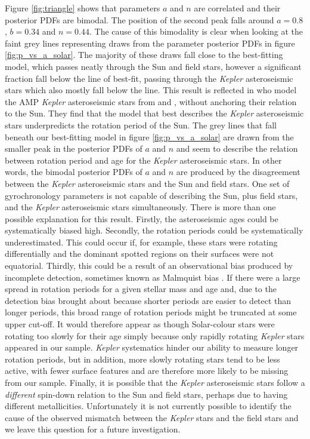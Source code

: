 \documentclass[useAMS, usenatbib]{mn2e}
\begin{document}
Figure \ref{fig:triangle} shows that parameters $a$ and $n$ are
correlated and their posterior PDFs are bimodal.
The position of the second peak falls around $a = 0.8$, $b = 0.34$ and
$n = 0.44$.
The cause of this bimodality is clear when looking at the faint grey lines
representing draws from the parameter posterior PDFs in
figure \ref{fig:p_vs_a_solar}.
The majority of these draws fall close to the best-fitting model, which passes
neatly through the Sun and field stars, however a significant fraction fall
below the line of best-fit, passing through the {\it Kepler} asteroseismic
stars which also mostly fall below the line.
This result is reflected in \citet{Garcia2014} who model the AMP {\it Kepler}
asteroseismic stars from \citet{Mathur2012} and \citet{Metcalfe2014}, without
anchoring their relation to the Sun.
They find that the model that best describes the {\it Kepler} asteroseismic
stars underpredicts the rotation period of the Sun.
The grey lines that fall beneath our best-fitting model in figure
\ref{fig:p_vs_a_solar} are drawn from the smaller peak in the posterior PDFs
of $a$ and $n$ and seem to describe the relation between rotation period and
age for the {\it Kepler} asteroseismic stars.
In other words, the bimodal posterior PDFs of $a$ and $n$ are produced by the
disagreement between the {\it Kepler} asteroseismic stars and the Sun and field
stars.
One set of gyrochronology parameters is not
capable of describing the Sun, plus field stars, and the {\it Kepler}
asteroseismic stars simultaneously.
There is more than one possible explanation for this result.
Firstly, the asteroseismic ages could be systematically biased high.
Secondly, the rotation periods could be systematically underestimated.
This could occur if, for example, these stars were rotating differentially
and the dominant spotted regions on their surfaces were not equatorial.
Thirdly, this could be a result of an observational bias produced by incomplete
detection, sometimes known as Malmquist bias \citep{Malmquist1920}.
If there were a large spread in rotation periods for a given stellar mass and
age and, due to the detection bias brought about because shorter periods are
easier to detect than longer periods, this broad range of rotation periods
might be truncated at some upper cut-off.
It would therefore appear as though Solar-colour stars were rotating too
slowly for their age simply because only rapidly rotating {\it Kepler} stars
appeared in our sample.
{\it Kepler} systematics hinder our ability to measure longer rotation periods,
but in addition, more slowly rotating stars tend to be less active, with
fewer surface features and are therefore more likely to be missing from our
sample.
Finally, it is possible that the {\it Kepler} asteroseismic stars follow a
\emph{different} spin-down relation to the Sun and field stars, perhaps due to
having different metallicities. %
Unfortunately it is not currently possible to identify the cause of the
observed mismatch between the {\it Kepler} stars and the field stars and we leave
this question for a future investigation.
\end{document}
